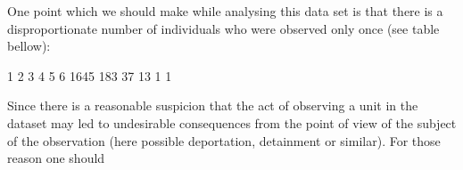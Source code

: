 \documentclass[
]{jss}
\newcommand{\1}{\mathcal{I}} \newcommand{\bZero}{\boldsymbol{0}}
\begin{document}
One point which we should make while analysing this data set is that
there is a disproportionate number of individuals who were observed only
once (see table bellow):

\begin{CodeChunk}
\begin{CodeOutput}

   1    2    3    4    5    6 
1645  183   37   13    1    1 
\end{CodeOutput}
\end{CodeChunk}

Since there is a reasonable suspicion that the act of observing a unit
in the dataset may led to undesirable consequences from the point of
view of the subject of the observation (here possible deportation,
detainment or similar). For those reason one should
\end{document}
